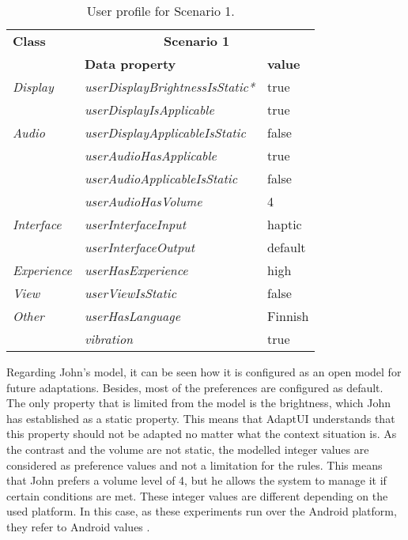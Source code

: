 \begin{table}
 \caption{User profile for Scenario 1.}
 \label{tbl:user_profile_scenario1}
 \footnotesize
 \centering
\begin{tabular}{l l l }
  \hline 
  \textbf{Class}  & \multicolumn{2}{c}{\textbf{Scenario 1}}		\\
		  & \textbf{Data property} & \textbf{value} 		\\
  \hline
  \textit{Display}& \textit{userDisplayBrightnessIsStatic*} & true	\\
		  & \textit{userDisplayIsApplicable}	    & true	\\
  \textit{Audio}  & \textit{userDisplayApplicableIsStatic}  & false	\\
		  & \textit{userAudioHasApplicable} 	    & true 	\\
		  & \textit{userAudioApplicableIsStatic}    & false 	\\
		  & \textit{userAudioHasVolume}  	    & 4 	\\
  \textit{Interface}& \textit{userInterfaceInput}	    & haptic	\\
		  & \textit{userInterfaceOutput} 	    & default	\\
  \textit{Experience}& \textit{userHasExperience} 	    & high	\\
  \textit{View}	  & \textit{userViewIsStatic}		    & false	\\
  \textit{Other}  & \textit{userHasLanguage}		    & Finnish	\\
		  & \textit{vibration} 			    & true 	\\
  \hline
\end{tabular}
\end{table}

Regarding John’s model, it can be seen how it is configured as an open model for
future adaptations. Besides, most of the preferences are configured as default. 
The only property that is limited from the model is the brightness, which John
has established as a static property. This means that AdaptUI understands that
this property should not be adapted no matter what the context situation is.
As the contrast and the volume are not static, the modelled integer values are
considered as preference values and not a limitation for the rules. This means
that John prefers a volume level of 4, but he allows the system to manage it if
certain conditions are met. These integer values are different depending on the
used platform. In this case, as these experiments run over the Android platform,
they refer to Android values \citep{android_volume}. 

